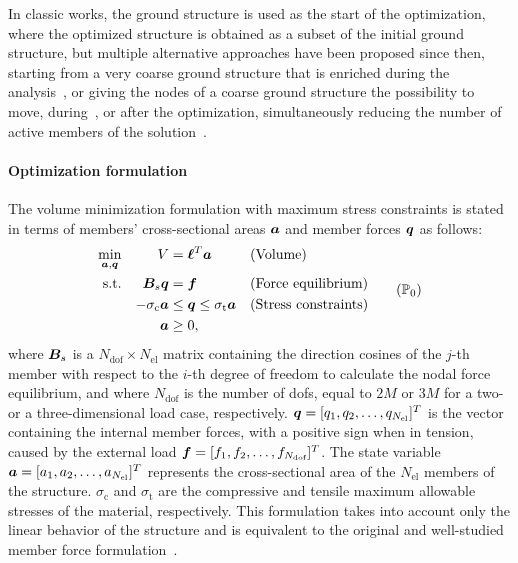 In classic works, the ground structure is used as the start of the optimization, where the optimized structure is obtained as a subset of the initial ground structure, but multiple alternative approaches have been proposed since then, \eg starting from a very coarse ground structure that is enriched during the analysis~, or giving the nodes of a coarse ground structure the possibility to move, during~, or after the optimization, simultaneously reducing the number of active members of the solution~.

\paragraph{Optimization formulation}

The volume minimization formulation with maximum stress constraints is stated in terms of members' cross-sectional areas $\bm{a}$ and member forces $\bm{q}$ as follows:
\begin{equation}
    \begin{aligned}
    \min_{\vect{a}, \vect{q}}   && V &= \vect{\ell}^{T}\vect{a} && \textrm{(Volume)}\\
    \textrm{s.t.}   && \matr{B}_s\vect{q} &= \vect{f} && \textrm{(Force equilibrium)}\\
    && -\sigma_\text{c}\vect{a} &\leq \vect{q} \leq \sigma_\text{t}\vect{a} && \textrm{(Stress constraints)} \\
    && \vect{a} &\geq 0, \\
    \end{aligned}
    \tag{$\mathbb{P}_0$}
    \label{eq:03_optim_original}
\end{equation}
where $\bm{B}_s$ is a $N_{\text{dof}} \times N_{\text{el}}$ matrix containing the direction cosines of the $j$-th member with respect to the $i$-th degree of freedom to calculate the nodal force equilibrium, and where $N_{\text{dof}}$ is the number of \gls{dofs}, equal to $2M$ or $3M$ for a two- or a three-dimensional load case, respectively. $\bm{q} = [q_1, q_2, \ldots,q_{N_{\text{el}}}]^T$ is the vector containing the internal member forces, with a positive sign when in tension, caused by the external load $\bm{f} = [f_1, f_2, \ldots,f_{N_{\text{dof}}}]^T$. The state variable $\bm{a} = [a_1, a_2, \ldots,a_{N_{\text{el}}}]^T$ represents the cross-sectional area of the $N_{\text{el}}$ members of the structure. $\sigma_\text{c}$ and $\sigma_\text{t}$ are the compressive and tensile maximum allowable stresses of the material, respectively. This formulation takes into account only the linear behavior of the structure and is equivalent to the original and well-studied member force formulation~.

